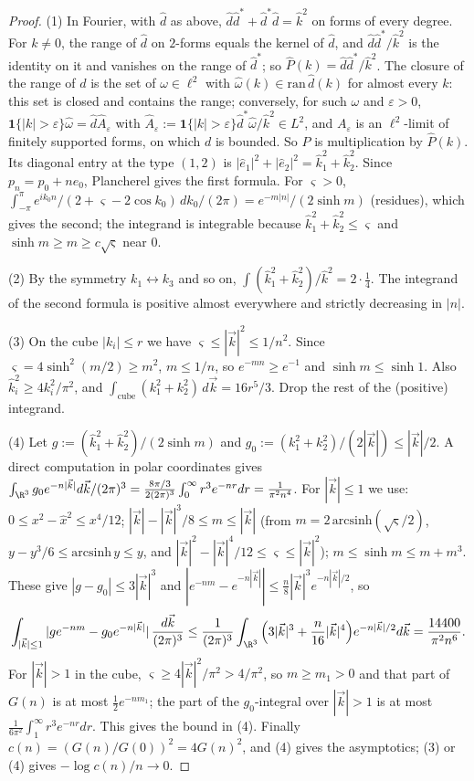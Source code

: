 \begin{proof}
(1) In Fourier, with $\hat d$ as above, $\hat d\hat d^*+\hat d^*\hat d=\hat k^2$ on forms of every degree. For $k\ne0$, the range of $\hat d$ on $2$-forms equals the kernel of $\hat d$, and $\hat d\hat d^*/\hat k^2$ is the identity on it and vanishes on the range of $\hat d^*$; so $\hat P(k)=\hat d\hat d^*/\hat k^2$. The closure of the range of $d$ is the set of $\omega\in\ell^2$ with $\hat\omega(k)\in\mathrm{ran}\,\hat d(k)$ for almost every $k$: this set is closed and contains the range; conversely, for such $\omega$ and $\varepsilon>0$, $\mathbf 1\{|k|>\varepsilon\}\hat\omega=\hat d\hat A_\varepsilon$ with $\hat A_\varepsilon:=\mathbf 1\{|k|>\varepsilon\}\hat d^*\hat\omega/\hat k^2\in L^2$, and $A_\varepsilon$ is an $\ell^2$-limit of finitely supported forms, on which $d$ is bounded. So $P$ is multiplication by $\hat P(k)$. Its diagonal entry at the type $(1,2)$ is $|\hat e_1|^2+|\hat e_2|^2=\hat k_1^2+\hat k_2^2$. Since $p_n=p_0+ne_0$, Plancherel gives the first formula. For $\varsigma >0$, $\int_{-\pi}^\pi e^{ik_0n}/(2+\varsigma -2\cos k_0)\,dk_0/(2\pi)=e^{-m|n|}/(2\sinh m)$ (residues), which gives the second; the integrand is integrable because $\hat k_1^2+\hat k_2^2\le \varsigma $ and $\sinh m\ge m\ge c\sqrt \varsigma $ near $0$.

(2) By the symmetry $k_1\leftrightarrow k_3$ and so on, $\int(\hat k_1^2+\hat k_2^2)/\hat k^2=2\cdot\frac14$. The integrand of the second formula is positive almost everywhere and strictly decreasing in $|n|$.

(3) On the cube $|k_i|\le r$ we have $\varsigma \le|\vec k|^2\le1/n^2$. Since $\varsigma =4\sinh^2(m/2)\ge m^2$, $m\le1/n$, so $e^{-mn}\ge e^{-1}$ and $\sinh m\le\sinh1$. Also $\hat k_i^2\ge4k_i^2/\pi^2$, and $\int_{\text{cube}}(k_1^2+k_2^2)\,d\vec k=16r^5/3$. Drop the rest of the (positive) integrand.

(4) Let $g:=(\hat k_1^2+\hat k_2^2)/(2\sinh m)$ and $g_0:=(k_1^2+k_2^2)/(2|\vec k|)\le|\vec k|/2$. A direct computation in polar coordinates gives $\int_{\R^3}g_0e^{-n|\vec k|}d\vec k/(2\pi)^3=\frac{8\pi/3}{2(2\pi)^3}\int_0^\infty r^3e^{-nr}dr=\frac1{\pi^2n^4}$. For $|\vec k|\le1$ we use: $0\le x^2-\hat x^2\le x^4/12$; $|\vec k|-|\vec k|^3/8\le m\le|\vec k|$ (from $m=2\,\mathrm{arcsinh}(\sqrt \varsigma /2)$, $y-y^3/6\le\mathrm{arcsinh}\,y\le y$, and $|\vec k|^2-|\vec k|^4/12\le \varsigma \le|\vec k|^2$); $m\le\sinh m\le m+m^3$. These give $|g-g_0|\le3|\vec k|^3$ and $|e^{-nm}-e^{-n|\vec k|}|\le\frac n8|\vec k|^3e^{-n|\vec k|/2}$, so
\[
\int_{|\vec k|\le1}|ge^{-nm}-g_0e^{-n|\vec k|}|\,\frac{d\vec k}{(2\pi)^3}\le\frac1{(2\pi)^3}\int_{\R^3}\Big(3|\vec k|^3+\frac n{16}|\vec k|^4\Big)e^{-n|\vec k|/2}d\vec k=\frac{14400}{\pi^2n^6}.
\]
For $|\vec k|>1$ in the cube, $\varsigma \ge4|\vec k|^2/\pi^2>4/\pi^2$, so $m\ge m_1>0$ and that part of $G(n)$ is at most $\tfrac12e^{-nm_1}$; the part of the $g_0$-integral over $|\vec k|>1$ is at most $\frac1{6\pi^2}\int_1^\infty r^3e^{-nr}dr$. This gives the bound in (4). Finally $c(n)=(G(n)/G(0))^2=4G(n)^2$, and (4) gives the asymptotics; (3) or (4) gives $-\log c(n)/n\to0$.
\end{proof}

